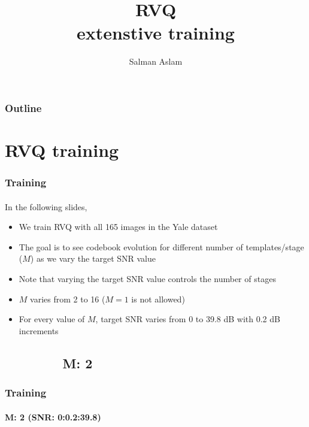 

\title{RVQ \\ extenstive training}
\begin{frame}\logoTechTower
	\author{Salman Aslam}
	\titlepage
\end{frame}

\begin{frame}
\frametitle{Outline}
\logoTechTower\logoCSIPCPL
	\tableofcontents
\end{frame}

\section{RVQ training}
\begin{frame}
\frametitle{Training}
\framesubtitle{}
\logoCSIPCPL\mypagenum
	In the following slides, 
		\begin{itemize}
			\item We train RVQ with all 165 images in the Yale dataset
			\item The goal is to see codebook evolution for different number of templates/stage ($M$) as we vary the target SNR value
			\item Note that varying the target SNR value controls the number of stages
			\item $M$ varies from 2 to 16 ($M=1$ is not allowed)
			\item For every value of $M$, target SNR varies from 0 to 39.8 dB with 0.2 dB increments
		\end{itemize}
\end{frame}

\subsection{\ \ \ \ \ \ \ \ M: 2}
\begin{frame}
\frametitle{Training}
\framesubtitle{M: 2 (SNR: 0:0.2:39.8)}
\logoCSIPCPL\mypagenum
\end{frame}


